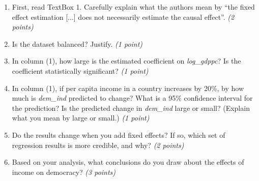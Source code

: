 \documentclass{article}
\begin{document}
\begin{enumerate}[label=\alph*)]

\item First, read TextBox 1. Carefully explain what the authors mean by ``the fixed effect estimation [...] does not necessarily estimate the causal effect''. \textit{(2 points)}
\item Is the dataset balanced? Justify. \textit{(1 point)}
\item In column (1), how large is the estimated coefficient on \textit{log\_gdppc}? Is the coefficient statistically significant? \textit{(1 point)}
\item In column (1), if per capita income in a country increases by 20\%, by how much is \textit{dem\_ind} predicted to change? What is a 95\% confidence interval for the prediction? Is the predicted change in \textit{dem\_ind} large or small? (Explain what you mean by large or small.) \textit{(1 point)}
\item Do the results change when you add fixed effects? If so, which set
of regression results is more credible, and why? \textit{(2 points)}
\item Based on your analysis, what conclusions do you draw about the effects of income on democracy? \textit{(3 points)}

\end{enumerate}
\end{document}
